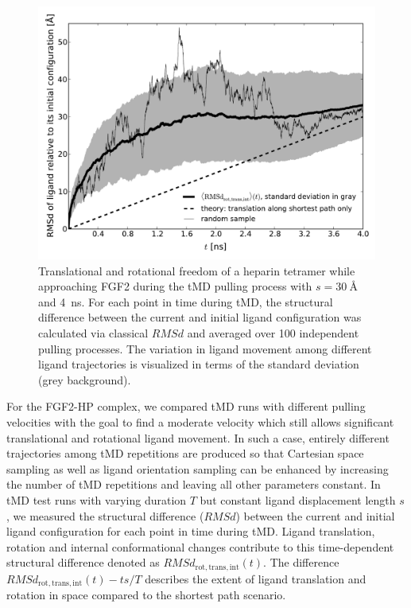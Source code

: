 \begin{figure}
\centering
\includegraphics[width=1.0\textwidth]{gfx/dmd/figure_2_freedom_over_time_100samples_avg_stddev_randomone_pub_003.pdf}
\caption[]{
Translational and rotational freedom of a heparin tetramer while approaching
FGF2 during the tMD pulling process with $s=\SI{30}{\angstrom}$ and
\SI{4}{\nano\second}. For each point in time during tMD, the structural
difference between the current and initial ligand configuration was calculated
via classical $RMSd$ and averaged over 100 independent pulling processes. The
variation in ligand movement among different ligand trajectories is visualized
in terms of the standard deviation (grey background). }
\label{fig:dmd:sampling}
\end{figure}



For the FGF2-HP complex, we compared tMD runs with different pulling velocities
with the goal to find a moderate velocity which still allows significant
translational and rotational ligand movement. In such a case, entirely different
trajectories among tMD repetitions are produced so that Cartesian space sampling
as well as ligand orientation sampling can be enhanced by increasing the number
of tMD repetitions and leaving all other parameters constant. In tMD test runs
with varying duration $T$ but constant ligand displacement length $s$, we
measured the structural difference ($RMSd$) between the current and initial
ligand configuration for each point in time during tMD. Ligand translation,
rotation and internal conformational changes contribute to this time-dependent
structural difference denoted as $RMSd_{\mathrm{rot,trans,int}}(t)$.  The
difference $RMSd_{\mathrm{rot,trans,int}}(t) - ts/T$ describes the extent of
ligand translation and rotation in space compared to the shortest path scenario.

